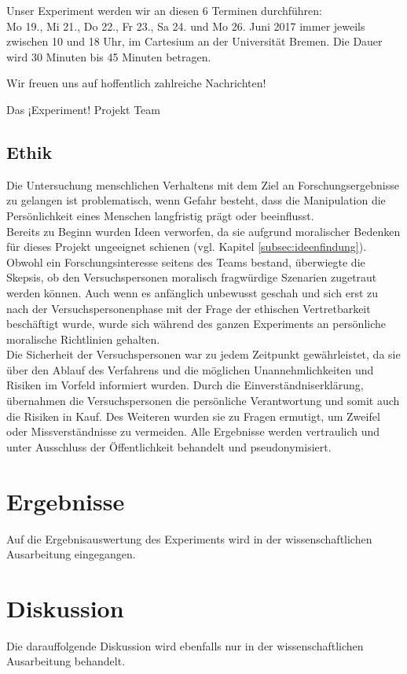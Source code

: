 \documentclass{Bericht}
\begin{document}
Unser Experiment werden wir an diesen 6 Terminen durchführen: \\

Mo 19., Mi 21., Do 22., Fr 23., Sa 24. und Mo 26. Juni 2017 immer jeweils zwischen 10 und 18 Uhr, im Cartesium an der Universität Bremen. Die Dauer wird 30 Minuten bis 45 Minuten betragen.

Wir freuen uns auf hoffentlich zahlreiche Nachrichten!

Das ¡Experiment! Projekt Team
\par 
\endgroup


\subsection{Ethik}
Die Untersuchung menschlichen Verhaltens mit dem Ziel an Forschungsergebnisse zu gelangen ist problematisch, wenn Gefahr besteht, dass die Manipulation die Persönlichkeit eines Menschen langfristig prägt oder beeinflusst.\\
 Bereits zu Beginn wurden Ideen verworfen, da sie aufgrund moralischer Bedenken für dieses Projekt ungeeignet schienen (vgl. Kapitel \ref{subsec:ideenfindung}). Obwohl ein Forschungsinteresse seitens des Teams bestand, überwiegte die Skepsis, ob den Versuchspersonen moralisch fragwürdige Szenarien zugetraut werden können. Auch wenn es anfänglich unbewusst geschah und sich erst zu nach der Versuchspersonenphase mit der Frage der ethischen Vertretbarkeit beschäftigt wurde, wurde sich während des ganzen Experiments an persönliche moralische Richtlinien gehalten. \\
Die Sicherheit der Versuchspersonen war zu jedem Zeitpunkt gewährleistet, da sie über den Ablauf des Verfahrens und die möglichen Unannehmlichkeiten und Risiken im Vorfeld informiert wurden. Durch die Einverständniserklärung, übernahmen die Versuchspersonen die persönliche Verantwortung und somit auch die Risiken in Kauf. Des Weiteren wurden sie zu Fragen ermutigt, um Zweifel oder Missverständnisse zu vermeiden. Alle Ergebnisse werden vertraulich und unter Ausschluss der Öffentlichkeit behandelt und pseudonymisiert.

\section{Ergebnisse}
Auf die Ergebnisauswertung des Experiments wird in der wissenschaftlichen Ausarbeitung eingegangen.
\section{Diskussion}
Die darauffolgende Diskussion wird ebenfalls nur in der wissenschaftlichen Ausarbeitung behandelt.
\end{document}
